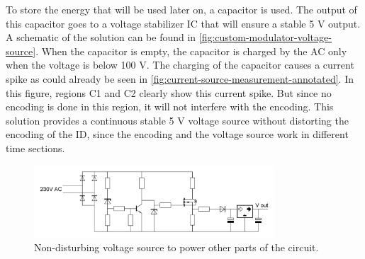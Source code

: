 	To store the energy that will be used later on, a capacitor is used.
	The output of this capacitor goes to a voltage stabilizer IC that will ensure a stable 5 V output.
	A schematic of the solution can be found in \autoref{fig:custom-modulator-voltage-source}.
	When the capacitor is empty, the capacitor is charged by the AC only when the voltage is below 100 V.
	The charging of the capacitor causes a current spike as could already be seen in \autoref{fig:current-source-measurement-annotated}.
	In this figure, regions C1 and C2 clearly show this current spike.
	But since no encoding is done in this region, it will not interfere with the encoding.
	This solution provides a continuous stable 5 V voltage source without distorting the encoding of the ID, since the encoding and the voltage source work in different time sections.

	\begin{figure}[t]
		\centering
		\includegraphics[angle=0,width=0.8\textwidth]{chapters/hardware-chapters/AC/ac-modulator/custom-hardware/ac-voltage-source/custom-modulator-voltage-source.JPG}
		\caption{Non-disturbing voltage source to power other parts of the circuit.}
		\label{fig:custom-modulator-voltage-source}
	\end{figure}
	
